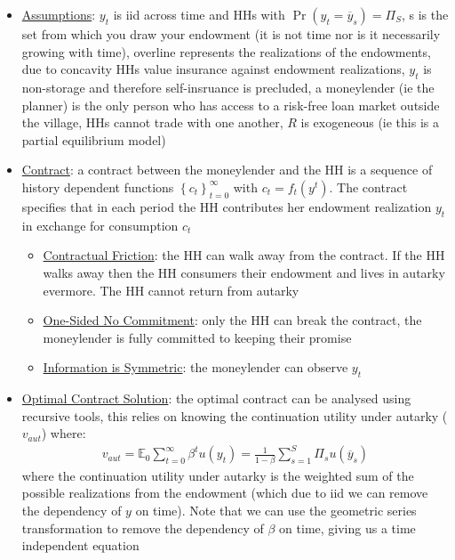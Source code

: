 \documentclass{article}
\begin{document}
\begin{itemize}
    \item \underline{Assumptions}: $y_{t}$ is iid across time and HHs with $\Pr (y_{t} = \overline{y}_{s}) = \Pi_{S}$, s is the set from which you draw your endowment (it is not time nor is it necessarily growing with time), overline represents the realizations of the endowments,   due to concavity HHs value insurance against endowment realizations, $y_{t}$ is non-storage and therefore self-insruance is precluded, a moneylender (ie the planner) is the only person who has access to a risk-free loan market outside the village, HHs cannot trade with one another, $R$ is exogeneous (ie this is a partial equilibrium model)
    \item  \underline{Contract}: a contract between the moneylender and the HH is a sequence of history dependent functions $\left\{c_{t}\right\}_{t=0}^{\infty}$ with $c_{t} = f_{t} (y^{t})$. The contract specifies that in each period the HH contributes her endowment realization $y_{t}$ in exchange for consumption $c_{t}$
    \begin{itemize}
        \item  \underline{Contractual Friction}: the HH can walk away from the contract. If the HH walks away then the HH consumers their endowment and lives in autarky evermore. The HH cannot return from autarky
        \item  \underline{One-Sided No Commitment}: only the HH can break the contract, the moneylender is fully committed to keeping their promise
        \item  \underline{Information is Symmetric}: the moneylender can observe $y_{t}$
    \end{itemize}
    \item  \underline{Optimal Contract Solution}: the optimal contract can be analysed using recursive tools, this relies on knowing the continuation utility under autarky ($v_{aut}$) where:
    \begin{gather*}
        v_{aut} = \mathbb{E}_{0} \sum_{t=0}^{\infty} \beta^{t} u(y_{t}) = \frac{1}{1-\beta} \sum_{s=1}^{S} \Pi_{s} u(\overline{y}_{s})
    \end{gather*}
    where the continuation utility under autarky is the weighted sum of the possible realizations from the endowment (which due to iid we can remove the dependency of $y$ on time). Note that we can use the geometric series transformation to remove the dependency of $\beta$ on time, giving us a time independent equation
    \begin{itemize}

\end{itemize}
\end{itemize}
\end{document}

